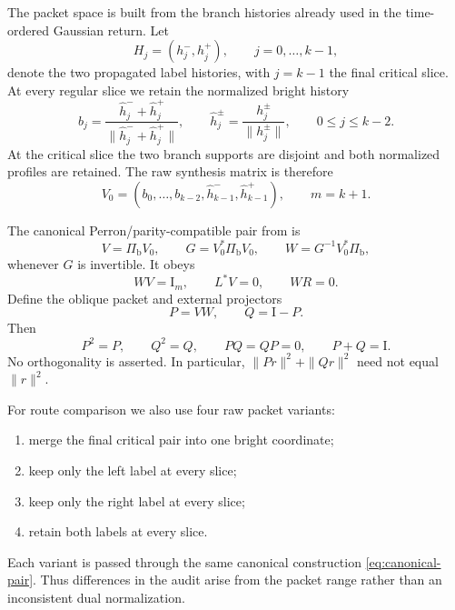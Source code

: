 \documentclass[11pt]{article}
\theoremstyle{definition}
\theoremstyle{remark}
\newcommand{\Id}{\mathrm I}
\begin{document}
The packet space is built from the branch histories already used in the
time-ordered Gaussian return.  Let
\begin{equation}
\label{eq:histories}
 H_j=(h_j^-,h_j^+),
 \qquad j=0,\ldots,k-1,
\end{equation}
denote the two propagated label histories, with $j=k-1$ the final critical
slice.  At every regular slice we retain the normalized bright history
\begin{equation}
\label{eq:bright-history}
 b_j=\frac{\widehat h_j^-+\widehat h_j^+}
 {\|\widehat h_j^-+\widehat h_j^+\|},
 \qquad
 \widehat h_j^\pm=\frac{h_j^\pm}{\|h_j^\pm\|},
 \qquad 0\le j\le k-2.
\end{equation}
At the critical slice the two branch supports are disjoint and both
normalized profiles are retained.  The raw synthesis matrix is therefore
\begin{equation}
\label{eq:raw-packet}
 V_0=(b_0,\ldots,b_{k-2},\widehat h_{k-1}^- ,
 \widehat h_{k-1}^+),
 \qquad m=k+1.
\end{equation}

The canonical Perron/parity-compatible pair from
\citep{WangBiorthogonal2026} is
\begin{equation}
\label{eq:canonical-pair}
 V=\Pi_{\mathrm b}V_0,
 \qquad
 G=V_0^*\Pi_{\mathrm b}V_0,
 \qquad
 W=G^{-1}V_0^*\Pi_{\mathrm b},
\end{equation}
whenever $G$ is invertible.  It obeys
\begin{equation}
\label{eq:pair-identities}
 WV=\Id_m,
 \qquad L^*V=0,
 \qquad WR=0.
\end{equation}
Define the oblique packet and external projectors
\begin{equation}
\label{eq:P-Q}
 P=VW,
 \qquad Q=\Id-P.
\end{equation}
Then
\begin{equation}
\label{eq:projector-identities}
 P^2=P,
 \qquad Q^2=Q,
 \qquad PQ=QP=0,
 \qquad P+Q=\Id.
\end{equation}
No orthogonality is asserted.  In particular, $\|Pr\|^2+\|Qr\|^2$ need
not equal $\|r\|^2$.

For route comparison we also use four raw packet variants:
\begin{enumerate}[label=(\roman*),leftmargin=2.4em]
 \item merge the final critical pair into one bright coordinate;
 \item keep only the left label at every slice;
 \item keep only the right label at every slice;
 \item retain both labels at every slice.
\end{enumerate}
Each variant is passed through the same canonical construction
\eqref{eq:canonical-pair}.  Thus differences in the audit arise from the
packet range rather than an inconsistent dual normalization.
\end{document}

